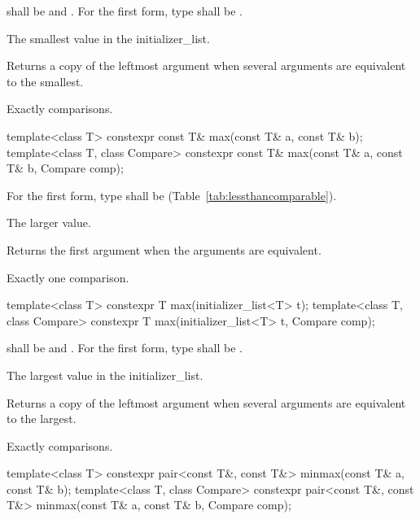 \begin{itemdescr}
\pnum
\requires {} shall be  and .
For the first form, type  shall be .

\pnum
\returns The smallest value in the initializer_list.

\pnum
\remarks Returns a copy of the leftmost argument when several arguments are equivalent to the smallest.\

\pnum
\complexity
Exactly  comparisons.
\end{itemdescr}

%
\begin{itemdecl}
template<class T> constexpr const T& max(const T& a, const T& b);
template<class T, class Compare>
  constexpr const T& max(const T& a, const T& b, Compare comp);
\end{itemdecl}

\begin{itemdescr}
\pnum
\requires
For the first form, type  shall be
 (Table~\ref{tab:lessthancomparable}).

\pnum
\returns
The larger value.

\pnum
\remarks
Returns the first argument when the arguments are equivalent.

\pnum
\complexity
Exactly one comparison.
\end{itemdescr}

%
\begin{itemdecl}
template<class T>
  constexpr T max(initializer_list<T> t);
template<class T, class Compare>
  constexpr T max(initializer_list<T> t, Compare comp);
\end{itemdecl}

\begin{itemdescr}
\pnum
\requires {} shall be  and .
For the first form, type  shall be .

\pnum
\returns The largest value in the initializer_list.

\pnum
\remarks Returns a copy of the leftmost argument when several arguments are equivalent to the largest.

\pnum
\complexity
Exactly  comparisons.
\end{itemdescr}

%
\begin{itemdecl}
template<class T> constexpr pair<const T&, const T&> minmax(const T& a, const T& b);
template<class T, class Compare>
  constexpr pair<const T&, const T&> minmax(const T& a, const T& b, Compare comp);
\end{itemdecl}


